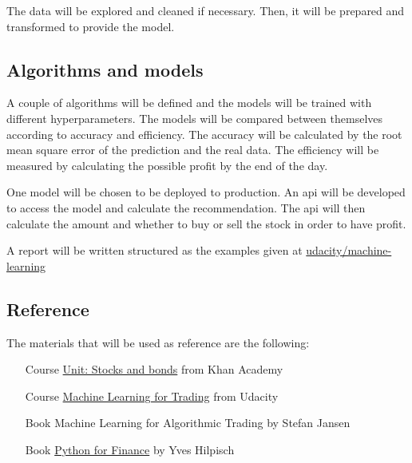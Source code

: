 \documentclass[12pt,openright,hidelinks,twoside,a4paper,english,french,spanish]{abntex2}
\begin{document}
The data will be explored and cleaned if necessary. Then, it will be
prepared and transformed to provide the model.

\hypertarget{algorithms-and-models}{%
\subsection*{Algorithms and models}\label{algorithms-and-models}}

A couple of algorithms will be defined and the models will be trained
with different hyperparameters. The models will be compared between
themselves according to accuracy and efficiency. The accuracy will be
calculated by the root mean square error of the prediction and the real
data. The efficiency will be measured by calculating the possible profit
by the end of the day.

One model will be chosen to be deployed to production. An api will be
developed to access the model and calculate the recommendation. The api
will then calculate the amount and whether to buy or sell the stock in
order to have profit.

A report will be written structured as the examples given at
\href{https://github.com/udacity/machine-learning/tree/master/projects/capstone}{udacity/machine-learning}

\hypertarget{reference}{%
\subsection*{Reference}\label{reference}}

The materials that will be used as reference are the following:
\begin{itemize}
	\item[Course] \href{https://www.khanacademy.org/economics-finance-domain/core-finance/stock-and-bonds}{Unit: Stocks and bonds} from Khan Academy
	\item[Course] \href{https://classroom.udacity.com/courses/ud501}{Machine Learning for Trading} from Udacity
	\item[Book] Machine Learning for Algorithmic Trading by Stefan Jansen
	\item[Book] \href{https://home.tpq.io/books/py4fi/}{Python for Finance} by Yves Hilpisch
\end{itemize}
\end{document}
